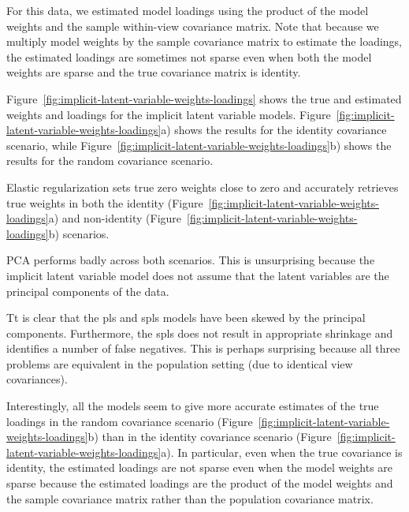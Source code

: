 For this data, we estimated model \gls{loadings} using the product of the model weights and the sample within-view covariance matrix.
Note that because we multiply model weights by the sample covariance matrix to estimate the loadings, the estimated \gls{loadings} are sometimes not sparse even when both the model weights are sparse and the true covariance matrix is identity.

Figure~\ref{fig:implicit-latent-variable-weights-loadings} shows the true and estimated \gls{weights} and \gls{loadings} for the implicit latent variable models. Figure~\ref{fig:implicit-latent-variable-weights-loadings}a) shows the results for the identity covariance scenario, while Figure~\ref{fig:implicit-latent-variable-weights-loadings}b) shows the results for the random covariance scenario.

Elastic regularization sets true zero weights close to zero and accurately retrieves true weights in both the identity (Figure~\ref{fig:implicit-latent-variable-weights-loadings}a) and non-identity (Figure~\ref{fig:implicit-latent-variable-weights-loadings}b) scenarios.

PCA performs badly across both scenarios. This is unsurprising because the implicit latent variable model does not assume that the latent variables are the principal components of the data.

Tt is clear that the \acrshort{pls} and \acrshort{spls} models have been skewed by the principal components.
Furthermore, the \acrshort{spls} does not result in appropriate shrinkage and identifies a number of false negatives.
This is perhaps surprising because all three problems are equivalent in the population setting (due to identical view covariances).

Interestingly, all the models seem to give more accurate estimates of the true loadings in the random covariance scenario (Figure~\ref{fig:implicit-latent-variable-weights-loadings}b) than in the identity covariance scenario (Figure~\ref{fig:implicit-latent-variable-weights-loadings}a).
In particular, even when the true covariance is identity, the estimated loadings are not sparse even when the model weights are sparse because the estimated loadings are the product of the model weights and the sample covariance matrix rather than the population covariance matrix.

